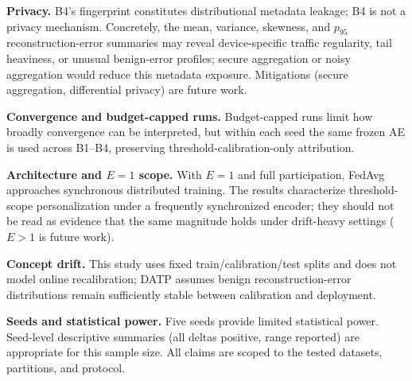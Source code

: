 \textbf{Privacy.}
B4's fingerprint constitutes distributional metadata leakage; B4 is not a privacy mechanism.
Concretely, the mean, variance, skewness, and $p_{95}$ reconstruction-error summaries may
reveal device-specific traffic regularity, tail heaviness, or unusual benign-error profiles;
secure aggregation or noisy aggregation would reduce this metadata exposure.
Mitigations (secure aggregation, differential privacy) are future work.

\textbf{Convergence and budget-capped runs.}
Budget-capped runs limit how broadly convergence can be interpreted, but within each seed the
same frozen AE is used across B1--B4, preserving threshold-calibration-only attribution.

\textbf{Architecture and $E{=}1$ scope.}
With $E{=}1$ and full participation, FedAvg approaches synchronous distributed training.
The results characterize threshold-scope personalization under a frequently
synchronized encoder; they should not be read as evidence that the same magnitude
holds under drift-heavy settings ($E>1$ is future work).

\textbf{Concept drift.}
This study uses fixed train/calibration/test splits and does not model online
recalibration; DATP assumes benign reconstruction-error distributions remain
sufficiently stable between calibration and deployment.

\textbf{Seeds and statistical power.}
Five seeds provide limited statistical power.
Seed-level descriptive summaries (all deltas positive, range reported) are appropriate
for this sample size.
All claims are scoped to the tested datasets, partitions, and protocol.
